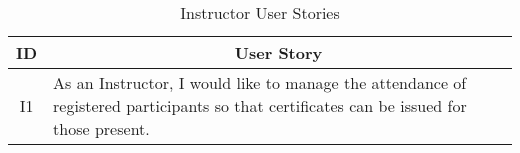 \begin{table}[!htb]
  \centering
  \setlength{\aboverulesep}{0pt}
  \setlength{\belowrulesep}{0pt}
  \caption{Instructor User Stories}
  \label{tab:instructor-user-stories}
  \footnotesize
  \begin{tabularx}{\textwidth}{c|X}
    \toprule
    \rowcolor[rgb]{0.753,0.753,0.753} \textbf{ID} & \multicolumn{1}{c}{\textbf{User Story}}                    \\
    \hline
    \rowcolor[rgb]{0.898,0.898,0.898} I1          & As an Instructor, I would like to manage the attendance of registered participants so that certificates can be issued for those present.                                           \\
    \bottomrule
  \end{tabularx}
\end{table}